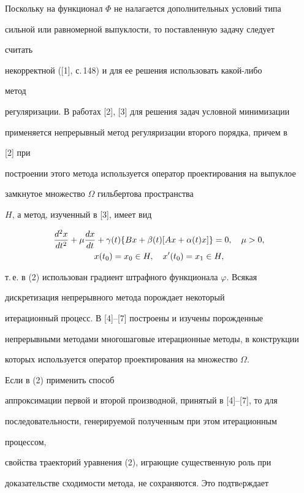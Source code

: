 Поскольку на функционал $\Phi$ не налагается дополнительных условий типа


сильной или равномерной выпуклости, то поставленную задачу следует


считать


некорректной ([1], с.\,148) и для ее решения использовать какой-либо


метод


регуляризации. В работах [2], [3] для решения задач условной минимизации


применяется непрерывный метод регуляризации второго порядка, причем в


[2] при


построении этого метода используется оператор проектирования на выпуклое


замкнутое множество $\Omega $ гильбертова пространства


$H$, а метод, изученный в [3], имеет вид


\begin{gather}\label {2}


\frac{d^2x}{dt^2} +\mu \frac{dx}{dt} + \gamma (t) \{Bx +\beta


(t)[Ax+\alpha (t)x]\} = 0,\quad \mu >0, \\


%


x(t_0)=x_0\in H,\quad x'(t_0)=x_1 \in H,\notag


\end{gather}


т.\,е. в (2) использован градиент штрафного функционала $\varphi$. Всякая


дискретизация непрерывного метода порождает некоторый


итерационный процесс. В [4]--[7] построены и изучены порожденные


непрерывными методами многошаговые итерационные методы, в конструкции


которых используется оператор проектирования на множество $\Omega$.


Если в (2) применить способ


аппроксимации первой и второй производной, принятый в [4]--[7], то для


последовательности, генерируемой полученным при этом итерационным


процессом,


свойства траекторий уравнения (2), играющие существенную роль при


доказательстве сходимости метода, не сохраняются. Это подтвeрждает


